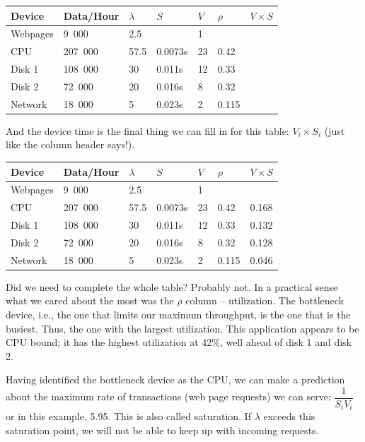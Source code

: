 \begin{center}
\begin{tabular}{|l|l|l|l|l|l|l|} \hline
	\textbf{Device} & \textbf{Data/Hour} & \textbf{$\lambda$} & \textbf{$S$} & \textbf{$V$} & \textbf{$\rho$} & \textbf{$V \times S$} \\ \hline
	Webpages & 9~000 & 2.5 & & 1 & & \\ \hline
	CPU & 207~000 & 57.5 & 0.0073s & 23 & 0.42 & \\ \hline
	Disk 1 & 108~000 & 30 & 0.011s  & 12& 0.33 &\\ \hline
	Disk 2 & 72~000 & 20 & 0.016s & 8 & 0.32 &\\ \hline
	Network & 18~000 & 5 & 0.023s & 2 & 0.115 &\\ \hline
\end{tabular}
\end{center}

And the device time is the final thing we can fill in for this table: $V_{i} \times S_{i}$ (just like the column header says!).

\begin{center}
\begin{tabular}{|l|l|l|l|l|l|l|} \hline
	\textbf{Device} & \textbf{Data/Hour} & \textbf{$\lambda$} & \textbf{$S$} & \textbf{$V$} & \textbf{$\rho$} & \textbf{$V \times S$} \\ \hline
	Webpages & 9~000 & 2.5 & & 1 & & \\ \hline
	CPU & 207~000 & 57.5 & 0.0073s & 23 & 0.42 & 0.168\\ \hline
	Disk 1 & 108~000 & 30 & 0.011s  & 12& 0.33 & 0.132\\ \hline
	Disk 2 & 72~000 & 20 & 0.016s & 8 & 0.32 & 0.128\\ \hline
	Network & 18~000 & 5 & 0.023s & 2 & 0.115 & 0.046\\ \hline
\end{tabular}
\end{center}

Did we need to complete the whole table? Probably not. In a practical sense what we cared about the most was the $\rho$ column -- utilization. The bottleneck device, i.e., the one that limits our maximum throughput, is the one that is the busiest. Thus, the one with the largest utilization. This application appears to be CPU bound; it has the highest utilization at 42\%, well ahead of disk 1 and disk 2. 

Having identified the bottleneck device as the CPU, we can make a prediction about the maximum rate of transactions (web page requests) we can serve: $\dfrac{1}{S_{i}V_{i}}$ or in this example, 5.95. This is also called saturation. If $\lambda$ exceeds this saturation point, we will not be able to keep up with incoming requests.

